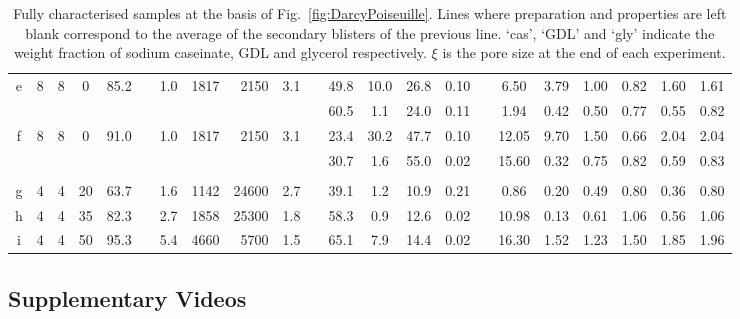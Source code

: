\documentclass[twocolumn,superscriptaddress,showpacs,preprintnumbers,
amsmath,amssymb,prl]{revtex4-1}
\begin{document}
\begin{table*}
\begin{tabular}{cSSSScSrrScSSSScSSSSSS}
e & 8 & 8 & 0 & 85.2 && 1.0 & 1817 & 2150 & 3.1 && 49.8 & 10.0 & 26.8 & 0.10 && 6.50 & 3.79 & 1.00 & 0.82 & 1.60 & 1.61 \\ 
& & & & && & & & && 60.5 & 1.1 & 24.0 & 0.11 && 1.94 & 0.42 & 0.50 & 0.77 & 0.55 & 0.82\\
f & 8 & 8 & 0 & 91.0 && 1.0 & 1817 & 2150 & 3.1 && 23.4 & 30.2 & 47.7 & 0.10 && 12.05 & 9.70 & 1.50 & 0.66 & 2.04 & 2.04 \\ 
& & & & && & & & && 30.7 & 1.6 & 55.0 & 0.02 && 15.60 & 0.32 & 0.75 & 0.82 & 0.59 & 0.83 \\
   \\[-2ex]
g & 4 & 4 & 20 & 63.7 && 1.6 & 1142 & 24600 & 2.7 && 39.1 & 1.2 & 10.9 & 0.21 && 0.86 & 0.20 & 0.49 & 0.80 & 0.36 & 0.80 \\ 
h & 4 & 4 & 35 & 82.3 && 2.7 & 1858 & 25300 & 1.8 && 58.3 & 0.9 & 12.6 & 0.02 && 10.98 & 0.13 & 0.61 & 1.06 & 0.56 & 1.06 \\ 
i & 4 & 4 & 50 & 95.3 && 5.4 & 4660 & 5700 & 1.5 && 65.1 & 7.9 & 14.4 & 0.02 && 16.30 & 1.52 & 1.23 & 1.50 & 1.85 & 1.96 \\ 
\end{tabular}
\caption{Fully characterised samples at the basis of Fig.~\ref{fig:DarcyPoiseuille}. Lines where preparation and properties are left blank correspond to the average of the secondary blisters of the previous line. `cas', `GDL' and `gly' indicate the weight fraction of sodium caseinate, GDL and glycerol respectively. $\xi$ is the pore size at the end of each experiment.}
\label{tab:data}
\end{table*}


\subsection*{Supplementary Videos}
\end{document}
